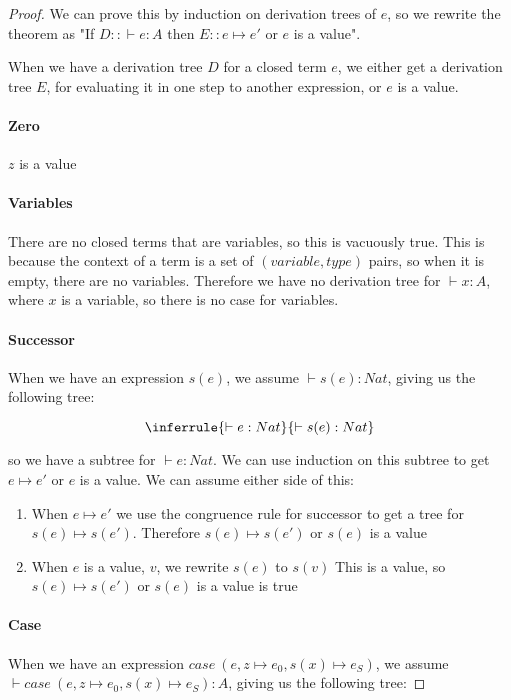 \begin{proof}
We can prove this by induction on derivation trees of $e$, so we rewrite the theorem as "If $D ::\vdash e : A$ then $E::e \mapsto e'$ or $e$ is a value".

When we have a derivation tree $D$ for a closed term $e$, we either get a derivation tree $E$, for evaluating it in one step to another expression, or $e$ is a value.  

\paragraph{Zero} $z$ is a value

\paragraph{Variables} There are no closed terms that are variables, so this is vacuously true. This is because the context of a term is a set of $(variable, type)$ pairs, so when it is empty, there are no variables. Therefore we have no derivation tree for $\vdash x : A$, where $x$ is a variable, so there is no case for variables.

\paragraph{Successor} When we have an expression $s(e)$, we assume $\vdash s(e) : Nat$, giving us the following tree:

$$
\inferrule {\vdash e : Nat }
 {\vdash s(e) : Nat}
$$

so we have a subtree for $\vdash e : Nat$. We can use induction on this subtree to get $e \mapsto e'$ or $e$ is a value. We can assume either side of this:

\begin{enumerate}
\item{When $e \mapsto e'$ we use the congruence rule for successor to get a tree for $s(e) \mapsto s(e')$. Therefore $s(e) \mapsto s(e')$ or $s(e)$ is a value}
\item{When $e$ is a value, $v$, we rewrite $s(e)$ to $s(v)$ This is a value, so $s(e) \mapsto s(e')$ or $s(e)$ is a value is true}
\end{enumerate}


\paragraph{Case} When we have an expression $case  \ (e,z \mapsto e_0, s(x) \mapsto e_S)$, we assume $\vdash case  \ (e,z \mapsto e_0, s(x) \mapsto e_S) :A$, giving us the following tree:


\end{proof}

